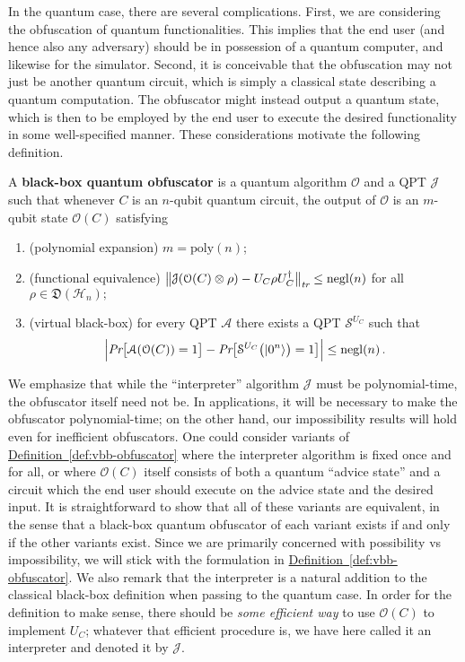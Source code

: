 \documentclass[envcountsame]{llncs}
\numberwithin{equation}{section}
\newcommand{\opn}{\operatorname}
\newcommand{\expref}[2]{\texorpdfstring{\hyperref[#2]{#1~\ref{#2}}}{#1~\ref{#2}}}
\newcommand{\algo}{\mathcal}
\newcommand{\negl}{\opn{negl}}
\newcommand{\states}{\mathfrak D}
\begin{document}
In the quantum case, there are several complications. First, we are considering the obfuscation of quantum functionalities. This implies that the end user (and hence also any adversary) should be in possession of a quantum computer, and likewise for the simulator. Second, it is conceivable that the obfuscation may not just be another quantum circuit, which is simply a classical state describing a quantum computation. The obfuscator might instead output a quantum state, which is then to be employed by the end user to execute the desired functionality in some well-specified manner. These considerations motivate the following definition.
\begin{definition}\label{def:vbb-obfuscator}
A \textbf{black-box quantum obfuscator} is a quantum algorithm $\algo O$ and a QPT $\algo J$ such that whenever $C$ is an $n$-qubit quantum circuit, the output of $\algo O$ is an $m$-qubit state $\algo O(C)$ satisfying
\begin{enumerate}
\item (polynomial expansion) $m = \text{poly}(n)$;
\item (functional equivalence) $\bigl\| \algo J ( \algo O(C) \otimes \rho ) - U_C \rho U_C^\dagger \bigr\|_\emph{tr} \leq \negl(n)$ for all $\rho \in \states(\mathcal H_n);$
\item (virtual black-box) for every QPT $\mathcal A$ there exists a QPT $\mathcal S^{U_C}$ such that
$$
\Bigl| \emph{Pr}\bigl[\mathcal A(\mathcal O(C)) = 1\bigr] - \emph{Pr}\bigl[\mathcal S^{U_C}\bigl(\ket{0^n}\bigr) = 1\bigr] \Bigr| \leq \negl(n)\,.
$$
\end{enumerate}
\end{definition}
We emphasize that while the ``interpreter'' algorithm $\algo J$ must be polynomial-time, the obfuscator itself need not be. In applications, it will be necessary to make the obfuscator polynomial-time; on the other hand, our impossibility results will hold even for inefficient obfuscators. One could consider variants of \expref{Definition}{def:vbb-obfuscator} where the interpreter algorithm is fixed once and for all, or where $\algo O(C)$ itself consists of both a quantum ``advice state'' and a circuit which the end user should execute on the advice state and the desired input. It is straightforward to show that all of these variants are equivalent, in the sense that a black-box quantum obfuscator of each variant exists if and only if the other variants exist. Since we are primarily concerned with possibility vs impossibility, we will stick with the formulation in \expref{Definition}{def:vbb-obfuscator}. We also remark that the interpreter is a natural addition to the classical black-box definition when passing to the quantum case. In order for the definition to make sense, there should be \emph{some efficient way} to use $\algo O(C)$ to implement $U_C$; whatever that efficient procedure is, we have here called it an interpreter and denoted it by $\algo J$.
\end{document}
